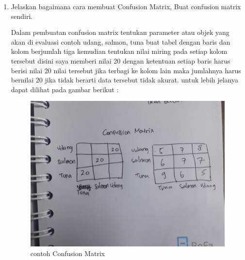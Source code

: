 \begin{enumerate}
		\item Jelaskan bagaimana cara membuat Confusion Matrix, Buat confusion matrix sendiri.\par
		Dalam pembuatan confusion matrix tentukan parameter atau objek yang akan di evaluasi contoh udang, salmon, tuna buat tabel dengan baris dan kolom berjumlah tiga kemudian tentukan nilai miring pada setiap kolom tersebut disini saya memberi nilai 20 dengan ketentuan setiap baris harus berisi nilai 20 nilai tersebut jika terbagi ke kolom lain maka jumlahnya harus bernilai 20 jika tidak berarti data tersebut tidak akurat. untuk lebih jelanya dapat dilihat pada gambar berikut :
		\begin{figure}[ht]
			\centering
			\includegraphics[scale=0.01]{figures/1174043/chapter2/6.jpg}
			\caption{contoh Confusion Matrix}
			\label{contoh}
		\end{figure}
		

\end{enumerate}
